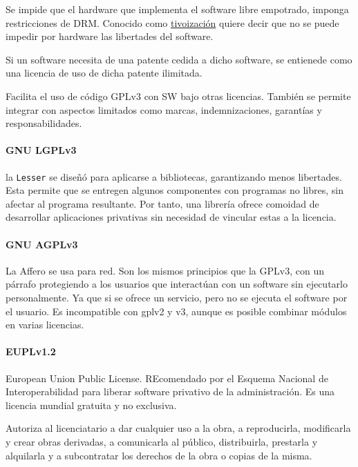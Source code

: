             Se impide que el hardware que implementa el software libre empotrado, imponga restricciones de DRM. Conocido como \href{https://en.wikipedia.org/wiki/Tivoization}{tivoización} quiere decir que no se puede impedir por hardware las libertades del software.

            Si un software necesita de una patente cedida a dicho software, se entienede como una licencia de uso de dicha patente ilimitada.

            Facilita el uso de código GPLv3 con SW bajo otras licencias. También se permite integrar con aspectos limitados como marcas, indemnizaciones, garantías y responsabilidades.

        \paragraph{GNU LGPLv3}
            la \texttt{Lesser} se diseñó para aplicarse a bibliotecas, garantizando menos libertades. Esta permite que se entregen algunos componentes con programas no libres, sin afectar al programa resultante. Por tanto, una librería ofrece comoidad de desarrollar aplicaciones privativas sin necesidad de vincular estas a la licencia.

        \paragraph{GNU AGPLv3}
            La Affero se usa para red. Son los mismos principios que la GPLv3, con un párrafo protegiendo a los usuarios que interactúan con un software sin ejecutarlo personalmente. Ya que si se ofrece un servicio, pero no se ejecuta el software por el usuario. Es incompatible con gplv2 y v3, aunque es posible combinar módulos en varias licencias.

        \paragraph{EUPLv1.2}
            European Union Public License. REcomendado por el Esquema Nacional de Interoperabilidad para liberar software privativo de la administración. Es una licencia mundial gratuita y no exclusiva.

            Autoriza al licenciatario a dar cualquier uso a la obra, a reproducirla, modificarla y crear obras derivadas, a comunicarla al público, distribuirla, prestarla y alquilarla y a subcontratar los derechos de la obra o copias de la misma.

